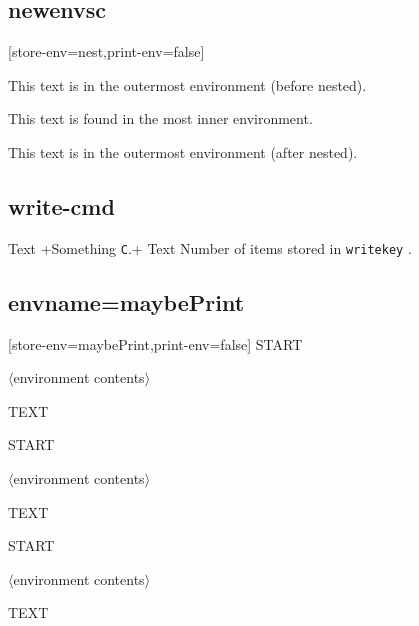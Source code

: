 \documentclass{article}
\begin{document}
\subsection{newenvsc}
[store-env=nest,print-env=false]

\begin{scnest}
This text is in the outermost environment (before nested).
\begin{scnest}[store-env=innernest]
This text is found in the most inner environment.
\end{scnest}
This text is in the outermost environment (after nested).
\end{scnest}

\par
{}

\subsection{write-cmd}
Text
\Scontents*[store-cmd=writekey,write-cmd=writekey2.tsc]+Something  		\verb|C|.+
Text
Number of items stored in  \verb+writekey+ .\par
\par
{}

\subsection{envname=maybePrint}
[store-env=maybePrint,print-env=false]
START
\begin{maybePrint}
  $\langle$environment contents$\rangle$
\end{maybePrint}
TEXT


START
\begin{maybePrint}
  $\langle$environment contents$\rangle$
\end{maybePrint}
TEXT

START
\begin{maybePrint}
  $\langle$environment contents$\rangle$
\end{maybePrint}
TEXT
\end{document}
